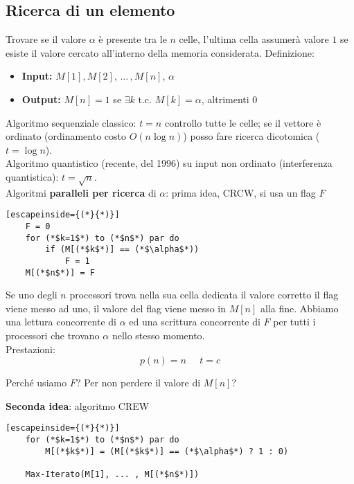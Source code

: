 \newpage


\subsection{Ricerca di un elemento}
Trovare se il valore $\alpha$ è presente tra le $n$ celle, l'ultima cella assumerà valore $1$ se esiste il valore cercato all'interno della memoria considerata. Definizione: 
\begin{itemize}
	\item \textbf{Input:} $M[1], M[2], \, ... \, , M[n]$, $\alpha$
	\item \textbf{Output:} $M[n] = 1$ se $\exists k$ t.c. $M[k] =\alpha$, altrimenti $0$
\end{itemize}

Algoritmo sequenziale classico: $t=n$ controllo tutte le celle; se il vettore è ordinato (ordinamento costo $O(n \log n)$) posso fare ricerca dicotomica ($t = \log n$).\\
Algoritmo quantistico (recente, del 1996) su input non ordinato (interferenza quantistica): $t = \sqrt{n}$.\\

Algoritmi \textbf{paralleli per ricerca} di $\alpha$: prima idea, CRCW, si usa un flag $F$
\begin{lstlisting}[escapeinside={(*}{*)}]
	F = 0
	for (*$k=1$*) to (*$n$*) par do
		if (M[(*$k$*)] == (*$\alpha$*))
			F = 1
	M[(*$n$*)] = F
\end{lstlisting}

Se uno degli $n$ processori trova nella sua cella dedicata il valore corretto il flag viene messo ad uno, il valore del flag viene messo in $M[n]$ alla fine. Abbiamo una lettura concorrente di $\alpha$ ed una scrittura concorrente di $F$ per tutti i processori che trovano $\alpha$ nello stesso momento.\\

Prestazioni: 
$$ p(n) = n \;\;\;\;\; t = c $$

Perché usiamo $F$? Per non perdere il valore di $M[n]$?

\newpage

\textbf{Seconda idea}: algoritmo CREW
\begin{lstlisting}[escapeinside={(*}{*)}]
	for (*$k=1$*) to (*$n$*) par do 
		M[(*$k$*)] = (M[(*$k$*)] == (*$\alpha$*) ? 1 : 0)
	
	Max-Iterato(M[1], ... , M[(*$n$*)])
\end{lstlisting}

